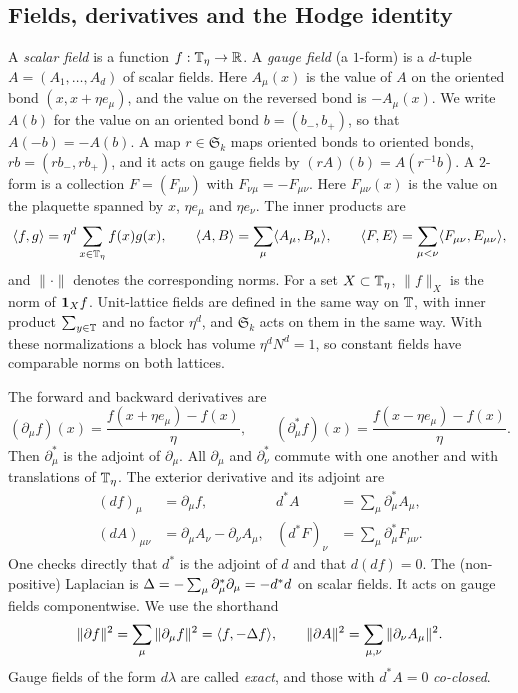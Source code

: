 \subsection{Fields, derivatives and the Hodge identity}\label{ss:2.2}

A \emph{scalar field} is a function $f:\mathbb T_\eta\to\mathbb R$. A \emph{gauge field} (a $1$-form) is a $d$-tuple $A=(A_1,\dots,A_d)$ of scalar fields. Here $A_\mu(x)$ is the value of $A$ on the oriented bond $(x,x+\eta e_\mu)$, and the value on the reversed bond is $-A_\mu(x)$. We write $A(b)$ for the value on an oriented bond $b=(b_-,b_+)$, so that $A(-b)=-A(b)$. A map $r\in\mathfrak S_k$ maps oriented bonds to oriented bonds, $rb=(rb_-,rb_+)$, and it acts on gauge fields by $(rA)(b)=A(r^{-1}b)$. A $2$-form is a collection $F=(F_{\mu\nu})$ with $F_{\nu\mu}=-F_{\mu\nu}$. Here $F_{\mu\nu}(x)$ is the value on the plaquette spanned by $x$, $\eta e_\mu$ and $\eta e_\nu$. The inner products are
\[
\langle f,g\rangle=\eta^d\sum_{x\in\mathbb T_\eta}f(x)g(x),\qquad
\langle A,B\rangle=\sum_{\mu}\langle A_\mu,B_\mu\rangle,\qquad
\langle F,E\rangle=\sum_{\mu<\nu}\langle F_{\mu\nu},E_{\mu\nu}\rangle,
\]
and $\|\cdot\|$ denotes the corresponding norms. For a set $X\subset\mathbb T_\eta$, $\|f\|_X$ is the norm of $\mathbf 1_Xf$. Unit-lattice fields are defined in the same way on $\mathbb T$, with inner product $\sum_{y\in\mathbb T}$ and no factor $\eta^d$, and $\mathfrak S_k$ acts on them in the same way. With these normalizations a block has volume $\eta^dN^d=1$, so constant fields have comparable norms on both lattices.

The forward and backward derivatives are
\[
(\partial_\mu f)(x)=\frac{f(x+\eta e_\mu)-f(x)}{\eta},\qquad (\partial_\mu^*f)(x)=\frac{f(x-\eta e_\mu)-f(x)}{\eta}.
\]
Then $\partial_\mu^*$ is the adjoint of $\partial_\mu$. All $\partial_\mu$ and $\partial_\nu^*$ commute with one another and with translations of $\mathbb T_\eta$. The exterior derivative and its adjoint are
\begin{align*}
(df)_\mu&=\partial_\mu f, & d^*A&=\sum_\mu\partial_\mu^*A_\mu,\\
(dA)_{\mu\nu}&=\partial_\mu A_\nu-\partial_\nu A_\mu, & (d^*F)_\nu&=\sum_\mu\partial_\mu^*F_{\mu\nu}.
\end{align*}
One checks directly that $d^*$ is the adjoint of $d$ and that $d(df)=0$. The (non-positive) Laplacian is $\Delta=-\sum_\mu\partial_\mu^*\partial_\mu=-d^*d$ on scalar fields. It acts on gauge fields componentwise. We use the shorthand
\[
\|\partial f\|^2=\sum_\mu\|\partial_\mu f\|^2=\langle f,-\Delta f\rangle,\qquad
\|\partial A\|^2=\sum_{\mu,\nu}\|\partial_\nu A_\mu\|^2 .
\]
Gauge fields of the form $d\lambda$ are called \emph{exact}, and those with $d^*A=0$ \emph{co-closed}.

